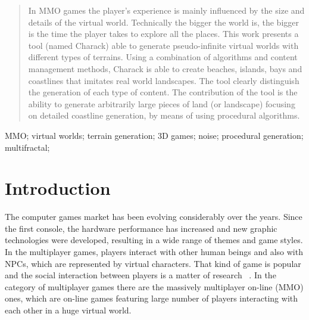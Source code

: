 \documentclass[10pt, conference, compsocconf]{IEEEtran}
\begin{document}




\maketitle


\begin{abstract}
In MMO games the player's experience is mainly influenced by the size and details of the virtual world. Technically the bigger the world is, the bigger is the time the player takes to explore all the places. This work presents a tool (named Charack) able to generate pseudo-infinite virtual worlds with different types of terrains. Using a combination of algorithms and content management methods, Charack is able to create beaches, islands, bays and coastlines that imitates real world landscapes. The tool clearly distinguish the generation of each type of content. The contribution of the tool is the ability to generate arbitrarily large pieces of land (or landscape) focusing on detailed coastline generation, by means of using procedural algorithms.
\end{abstract}

\begin{IEEEkeywords}
MMO; virtual worlds; terrain generation; 3D games; noise; procedural generation; multifractal;

\end{IEEEkeywords}


%
\IEEEpeerreviewmaketitle


\section{Introduction}

The computer games market has been evolving considerably over the years. Since the first console, the hardware performance has increased and new graphic technologies were developed, resulting in a wide range of themes and game styles. In the multiplayer games, players interact with other human beings and also with NPCs, which are represented by virtual characters. That kind of game is popular and the social interaction between players is a matter of research ~\cite{onlineGaming,ducheneaut}. In the category of multiplayer games there are the massively multiplayer on-line (MMO) ones, which are on-line games featuring large number of players interacting with each other in a huge virtual world.
\end{document}
